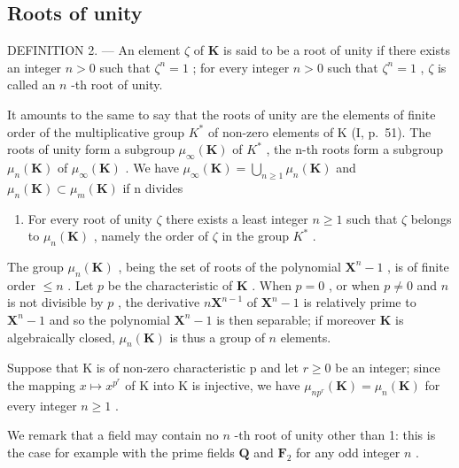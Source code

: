 \subsection{Roots of unity}

DEFINITION 2. --- An element \(\zeta\) of \(\mathbf{K}\) is said to be a root of unity if there exists an integer \(n > 0\) such that \(\zeta^n = 1\) ; for every integer \(n > 0\) such that \(\zeta^n = 1\) , \(\zeta\) is called an \(n\) -th root of unity.

It amounts to the same to say that the roots of unity are the elements of finite order of the multiplicative group \(K^{*}\) of non-zero elements of K (I, p.~51). The roots of unity form a subgroup \(\mu_{\infty}(\mathbf{K})\) of \(K^{*}\) , the n-th roots form a subgroup \(\mu_{n}(\mathbf{K})\) of \(\mu_{\infty}(\mathbf{K})\) . We have \(\mu_{\infty}(\mathbf{K}) = \bigcup_{n \geqslant 1} \mu_{n}(\mathbf{K})\) and \(\mu_{n}(\mathbf{K}) \subset \mu_{m}(\mathbf{K})\) if n divides

\begin{enumerate}
\def\labelenumi{\alph{enumi}.}
\setcounter{enumi}{12}
\tightlist
\item
  For every root of unity \(\zeta\) there exists a least integer \(n \geqslant 1\) such that \(\zeta\) belongs to \(\mu_{n}(\mathbf{K})\) , namely the order of \(\zeta\) in the group \(K^{*}\) .
\end{enumerate}

The group \(\mu_n(\mathbf{K})\) , being the set of roots of the polynomial \(\mathbf{X}^n - 1\) , is of finite order \(\leqslant n\) . Let \(p\) be the characteristic of \(\mathbf{K}\) . When \(p = 0\) , or when \(p \neq 0\) and \(n\) is not divisible by \(p\) , the derivative \(n\mathbf{X}^{n-1}\) of \(\mathbf{X}^n - 1\) is relatively prime to \(\mathbf{X}^n - 1\) and so the polynomial \(\mathbf{X}^n - 1\) is then separable; if moreover \(\mathbf{K}\) is algebraically closed, \(\mu_n(\mathbf{K})\) is thus a group of \(n\) elements.

Suppose that K is of non-zero characteristic p and let \(r \geqslant 0\) be an integer; since the mapping \(x \mapsto x^{p^{r}}\) of K into K is injective, we have \(\mu_{np^{r}}(\mathbf{K}) = \mu_n(\mathbf{K})\) for every integer \(n \geqslant 1\) .

We remark that a field may contain no \(n\) -th root of unity other than 1: this is the case for example with the prime fields \(\mathbf{Q}\) and \(\mathbf{F}_2\) for any odd integer \(n\) .

